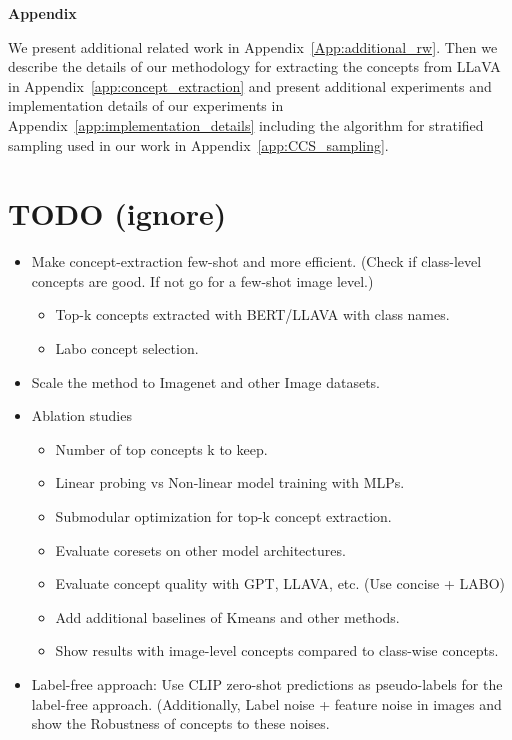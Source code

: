 \appendix
\onecolumn
\begin{center}
{\LARGE \bf Appendix}
\end{center}

We present additional related work in Appendix~\ref{App:additional_rw}. Then we describe the details of our methodology for extracting the concepts from LLaVA in Appendix~\ref{app:concept_extraction} and present additional experiments and implementation details of our experiments in Appendix~\ref{app:implementation_details} including the algorithm for stratified sampling used in our work in Appendix~\ref{app:CCS_sampling}.


\section{TODO (ignore)}
\begin{itemize}
    \item Make concept-extraction few-shot and more efficient. (Check if class-level concepts are good. If not go for a few-shot image level.)
    \begin{itemize}
        \item Top-k concepts extracted with BERT/LLAVA with class names.
        \item Labo concept selection.
    \end{itemize}

    \item Scale the method to Imagenet and other Image datasets. 

    \item Ablation studies
     \begin{itemize}
        \item Number of top concepts k to keep.
        \item Linear probing vs Non-linear model training with MLPs.
        \item Submodular optimization for top-k concept extraction. 
        \item Evaluate coresets on other model architectures.
        \item Evaluate concept quality with GPT, LLAVA, etc. (Use concise + LABO)
        \item Add additional baselines of Kmeans and other methods.
        \item Show results with image-level concepts compared to class-wise concepts.
     \end{itemize}

     \item Label-free approach: Use CLIP zero-shot predictions as pseudo-labels for the label-free approach. (Additionally, Label noise + feature noise in images and show the Robustness of concepts to these noises.


\end{itemize}
